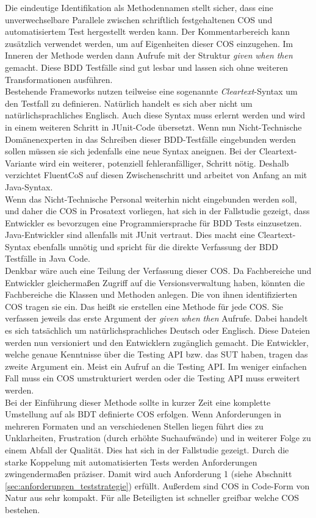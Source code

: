 Die eindeutige Identifikation als Methodennamen stellt sicher, dass eine unverwechselbare Parallele zwischen schriftlich festgehaltenen \Gls{COS} und automatisiertem Test hergestellt werden kann. Der Kommentarbereich kann zusätzlich verwendet werden, um auf Eigenheiten dieser \Gls{COS} einzugehen. Im Inneren der Methode werden dann Aufrufe mit der Struktur \textit{given} \textit{when} \textit{then} gemacht. Diese \Gls{BDD} Testfälle sind gut lesbar und lassen sich ohne weiteren Transformationen ausführen.\\
Bestehende Frameworks nutzen teilweise eine sogenannte \textit{Cleartext}-Syntax um den Testfall zu definieren. Natürlich handelt es sich aber nicht um natürlichsprachliches Englisch. Auch diese Syntax muss erlernt werden und wird in einem weiteren Schritt in JUnit-Code übersetzt. Wenn nun Nicht-Technische Domänenexperten in das Schreiben dieser BDD-Testfälle eingebunden werden sollen müssen sie sich jedenfalls eine neue Syntax aneignen. Bei der Cleartext-Variante wird ein weiterer, potenziell fehleranfälliger, Schritt nötig. Deshalb verzichtet FluentCoS auf diesen Zwischenschritt und arbeitet von Anfang an mit Java-Syntax.\\
Wenn das Nicht-Technische Personal weiterhin nicht eingebunden werden soll, und daher die \Gls{COS} in Prosatext vorliegen, hat sich in der Fallstudie gezeigt, dass Entwickler es bevorzugen eine Programmiersprache für \Gls{BDD} Tests einzusetzen. Java-Entwickler sind allenfalls mit JUnit vertraut. Dies macht eine Cleartext-Syntax ebenfalls unnötig und spricht für die direkte Verfassung der \Gls{BDD} Testfälle in Java Code.\\
Denkbar wäre auch eine Teilung der Verfassung dieser \Gls{COS}. Da Fachbereiche und Entwickler gleichermaßen Zugriff auf die Versionsverwaltung haben, könnten die Fachbereiche die Klassen und Methoden anlegen. Die von ihnen identifizierten \Gls{COS} tragen sie ein. Das heißt sie erstellen eine Methode für jede \Gls{COS}. Sie verfassen jeweils das erste Argument der \textit{given} \textit{when} \textit{then} Aufrufe. Dabei handelt es sich tatsächlich um natürlichsprachliches Deutsch oder Englisch. Diese Dateien werden nun versioniert und den Entwicklern zugänglich gemacht. Die Entwickler, welche genaue Kenntnisse über die Testing API bzw. das \Gls{SUT} haben, tragen das zweite Argument ein. Meist ein Aufruf an die Testing API. Im weniger einfachen Fall muss ein \Gls{COS} umstrukturiert werden oder die Testing API muss erweitert werden.\\
Bei der Einführung dieser Methode sollte in kurzer Zeit eine komplette Umstellung auf als \Gls{BDT} definierte \Gls{COS} erfolgen. Wenn Anforderungen in mehreren Formaten und an verschiedenen Stellen liegen führt dies zu Unklarheiten, Frustration (durch erhöhte Suchaufwände) und in weiterer Folge zu einem Abfall der Qualität. Dies hat sich in der Fallstudie gezeigt. Durch die starke Koppelung mit automatisierten Tests werden Anforderungen zwingendermaßen präziser. Damit wird auch Anforderung 1 (siehe Abschnitt \ref{sec:anforderungen_teststrategie}) erfüllt. Außerdem sind \Gls{COS} in Code-Form von Natur aus sehr kompakt. Für alle Beteiligten ist schneller greifbar welche \Gls{COS} bestehen.\\
